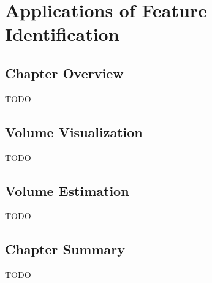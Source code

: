 \chapter{Applications of Feature Identification}

\section{Chapter Overview}

TODO

\section{Volume Visualization}

TODO

\section{Volume Estimation}

TODO

\section{Chapter Summary}

TODO
